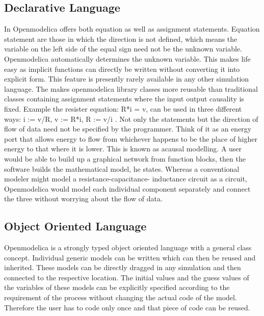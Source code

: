 \documentclass[12pt]{report}
\begin{document}
\subsection{Declarative Language}
In Openmodelica offers both equation as well as assignment statements. Equation statement are those in which the direction is not defined, which means the variable on the left side of the equal sign need not be the unknown variable. Openmodelica automatically determines the unknown variable. This makes life easy as implicit functions can directly be written without converting it into explicit form. This feature is presently rarely available in any other simulation language. The makes openmodelica library classes more reusable than traditional classes containing assignment statements where the input output causality is fixed. Example the resister equation: R*i = v, can be used in three different ways: i := v/R, v := R*i, R := v/i \cite{PeterFrit}.
Not only the statements but the direction of flow of data need not be specified by the programmer. Think of it as an energy port that allows energy to flow from whichever happens to be the place of higher energy to that where it is lower. This is known as acausal modelling. A user would be able to build up a graphical network from function blocks, then the software builds the mathematical model, he states.
Whereas a conventional modeler might model a resistance-capacitance- inductance circuit as a circuit, Openmodelica would model each individual component separately and connect the three without worrying about the flow of data\cite{PeterFrit}.

\subsection{Object Oriented Language}
Openmodelica is a strongly typed object oriented language with a general class concept. Individual generic models can be written which can then be reused and inherited. These models can be directly dragged in any simulation and then connected to the respective location.
The initial values and the guess values of the variables of these models can be explicitly specified according to the requirement of the process without changing the actual code of the model. Therefore the user has to code only once and that piece of code can be reused.
\end{document}
